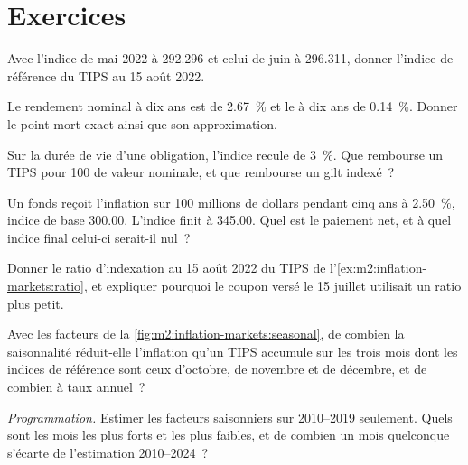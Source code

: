 \section{Exercices}

\begin{exercise}[$\star$]\label{exo:m2:inflation-markets:1}
Avec l'indice de mai 2022 à 292.296 et celui de juin à 296.311, donner
l'indice de référence du TIPS au 15 août 2022.
\end{exercise}

\begin{exercise}[$\star$]\label{exo:m2:inflation-markets:2}
Le rendement nominal à dix ans est de 2.67~\% et le  à dix ans de 0.14~\%. Donner
le point mort exact ainsi que son approximation.
\end{exercise}

\begin{exercise}[$\star$]\label{exo:m2:inflation-markets:3}
Sur la durée de vie d'une obligation, l'indice recule de 3~\%. Que rembourse un TIPS pour 100
de valeur nominale, et que rembourse un gilt indexé~?
\end{exercise}

\begin{exercise}[$\star\star$]\label{exo:m2:inflation-markets:4}
Un fonds reçoit l'inflation sur 100 millions de dollars pendant cinq ans à 2.50~\%, indice de
base 300.00. L'indice finit à 345.00. Quel est le paiement net, et à quel
indice final celui-ci serait-il nul~?
\end{exercise}

\begin{exercise}[$\star\star$]\label{exo:m2:inflation-markets:5}
Donner le ratio d'indexation au 15 août 2022 du TIPS de
l'\cref{ex:m2:inflation-markets:ratio}, et expliquer pourquoi le coupon versé le 15
juillet utilisait un ratio plus petit.
\end{exercise}

\begin{exercise}[$\star\star$]\label{exo:m2:inflation-markets:6}
Avec les facteurs de la \cref{fig:m2:inflation-markets:seasonal}, de combien la
saisonnalité réduit-elle l'inflation qu'un TIPS accumule sur les trois mois dont
les indices de référence sont ceux d'octobre, de novembre et de décembre, et de combien
à taux annuel~?
\end{exercise}

\begin{exercise}[$\star\star\star$]\label{exo:m2:inflation-markets:7}
\emph{Programmation.} Estimer les facteurs saisonniers sur 2010--2019 seulement. Quels sont les
mois les plus forts et les plus faibles, et de combien un mois quelconque s'écarte de
l'estimation 2010--2024~?
\end{exercise}

